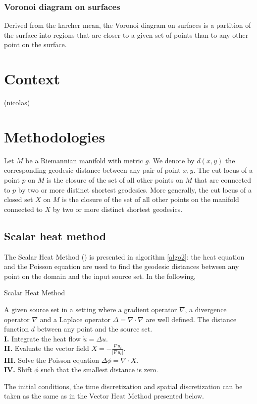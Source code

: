 \documentclass[sigconf]{acmart}
\begin{document}
\subsubsection{Voronoi diagram on surfaces}
Derived from the karcher mean, the Voronoi diagram on surfaces is a partition of the surface into regions that are closer to a given set of points than to any other point on the surface. 


\section{Context}
(nicolas)

\section{Methodologies}
Let $M$ be a Riemannian manifold with metric $g$. We denote by $d(x,y)$ the corresponding geodesic distance between any pair of point $x,y$. 
The cut locus of a point $p$ on $M$ is the closure of the set of all other points on $M$ that are connected to $p$
by two or more distinct shortest geodesics. More generally, the cut locus of a closed set $X$ on $M$ is the closure of the set of 
all other points on the manifold connected to $X$ by two or more distinct shortest geodesics.

\subsection{Scalar heat method}
The Scalar Heat Method (\cite{Crane:2017:HMD}) is presented in algorithm \ref{algo2}: the heat equation and the Poisson equation are used to find the geodesic distances
between any point on the domain and the input source set. In the following, 

\begin{algorithm}
  \caption{Scalar Heat Method} \label{algo2}
  \begin{algorithmic}
    \Require A given source set in a setting where a gradient operator $\nabla$, a divergence operator $\nabla$ and a Laplace operator $\Delta = \nabla \cdot \nabla$ 
    are well defined. 
    \Ensure The distance function $d$ between any point and the source set. \\
    \noindent \textbf{I.} Integrate the heat flow $\dot{u} = \Delta u.$\\
    \textbf{II. }Evaluate the vector field $X = -\frac{\nabla u_t}{|\nabla u_t|}.$ \\
    \textbf{III. }Solve the Poisson equation $\Delta \phi = \nabla \cdot X. $\\
    \textbf{IV. } Shift $\phi$ such that the smallest distance is zero. \\
  \end{algorithmic}
\end{algorithm}
The initial conditions, the time discretization and spatial discretization can be taken as the same as in the Vector Heat Method presented below. 
\end{document}
